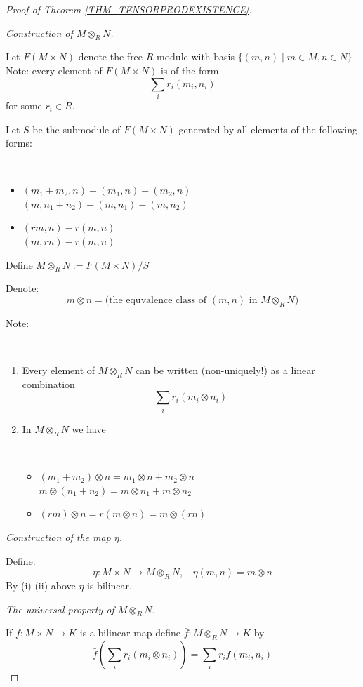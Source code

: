 \documentclass[12pt, letterpaper, oneside]{article}
\theoremstyle{plain}
\theoremstyle{definition}
\newcommand{\benu}{\begin{enumerate}}
\newcommand{\eenu}{\end{enumerate}}
\newcommand{\bit}{\begin{itemize}}
\newcommand{\eit}{\end{itemize}}
\newcommand{\vs}{\vskip 5mm}
\begin{document}
\begin{proof}[Proof of Theorem \ref{THM_TENSORPRODEXISTENCE}]\ 

\emph{Construction of $M\otimes_{R} N$.} 

Let $F(M\times N)$ denote the free $R$-module with basis $\{ (m, n) \mid m\in M, n\in N\}$
Note: every element of $F(M\times N)$ is of the form 
$$\sum_{i} r_{i}(m_{i}, n_{i})$$
for some $r_{i}\in R$. 

Let $S$ be the submodule of $F(M\times N)$ generated by all elements of the following forms:

\vskip -13mm

\ 
\bit
\item[(i)] $(m_{1}+ m_{2}, n) - (m_{1}, n) - (m_{2}, n)$ \\
$(m,  n_{1} + n_{2}) - (m, n_{1}) - (m, n_{2})$
\item[(ii)] $(rm, n) - r(m, n)$ \\
$(m, rn) - r(m, n)$
\eit


Define $M\otimes_{R} N := F(M\times N)/S$

Denote:
 $$m\otimes n = \text{(the equvalence class of $(m, n)$ in $M\otimes_{R} N$)} $$

Note:

\vskip -13mm

\ 
\benu
\item Every element of $M\otimes_{R}N$ can be written (non-uniquely!) as a linear combination
$$\sum_{i} r_{i} (m_{i}\otimes n_{i})$$
\item In $M\otimes_{R}N$ we have 

\vskip -5mm

\ 
\bit
\item[(i)] $(m_{1}+ m_{2})\otimes n  =  m_{1}\otimes n + m_{2}\otimes n$ \\
$ m\otimes (n_{1} + n_{2}) =  m\otimes n_{1} + m\otimes n_{2}$
\item[(ii)] $(rm)\otimes n =  r(m\otimes n) =  m\otimes (rn)$
\eit
\eenu


\vs 


\emph{Construction of the map $\eta$.}

Define:
$$\eta \colon M\times N \to M\otimes_{R} N, \ \ \ \ \eta(m, n) = m\otimes n$$ 
By (i)-(ii)  above $\eta$ is bilinear.


\vs

\emph{The universal property of $M\otimes_{R} N$.}

If $f\colon M\times N \to K$ is a bilinear map define  $\bar{f}\colon M\otimes_{R}N \to K$
by 
$$\bar{f}\left(\sum_{i}r_{i}(m_{i}\otimes n_{i})\right) = \sum_{i} r_{i} f(m_{i}, n_{i})$$


\end{proof}
\end{document}
